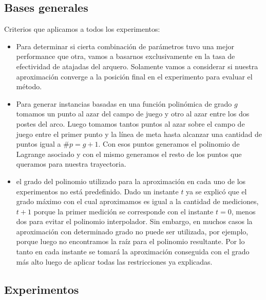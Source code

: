\subsection{Bases generales}
Criterios que aplicamos a todos los experimentos:
\begin{itemize}
	\item Para determinar si cierta combinación de parámetros tuvo una mejor performance que otra, vamos a basarnos exclusivamente en la tasa 
	de efectividad de atajadas del arquero. Solamente vamos a considerar si nuestra aproximación converge a la posición final en el experimento para 
	evaluar el método.
	\item Para generar instancias basadas en una función polinómica de grado $g$ tomamos un punto al azar del campo de juego y otro al azar entre los dos postes 
del arco. Luego tomamos tantos puntos al azar sobre el campo de juego entre el primer punto y la línea de meta hasta alcanzar una cantidad
de puntos igual a $\#p = g + 1$. Con esos puntos generamos el polinomio de Lagrange asociado y con el mismo generamos el resto de los puntos
que queramos para nuestra trayectoria.
	\item el grado del polinomio utilizado para la aproximación en cada uno de los experimentos no está predefinido. Dado un instante $t$ ya
       se explicó que el grado máximo con el cual aproximamos es igual a la cantidad de mediciones, $t+1$ porque la primer medición se corresponde
       con el instante $t = 0$, menos dos para evitar el polinomio interpolador. Sin embargo, en muchos casos la aproximación con determinado grado
       no puede ser utilizada, por ejemplo, porque luego no encontramos la raíz para el polinomio resultante. Por lo tanto en cada instante se tomará
       la aproximación conseguida con el grado más alto luego de aplicar todas las restricciones ya explicadas.

\end{itemize}

\subsection{Experimentos}

